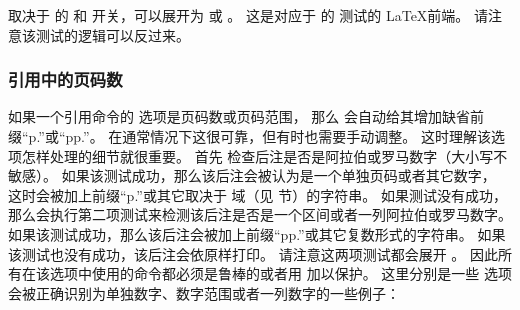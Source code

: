 \begin{ltxsyntax}



取决于  的  和  开关，可以展开为  或 。
这是对应于  的  测试的 \LaTeX 前端。
请注意该测试的逻辑可以反过来。

\end{ltxsyntax}

\subsubsection{引用中的页码数}%
\label{use:cav:pag}


如果一个引用命令的  选项是页码数或页码范围，
那么 \biblatex 会自动给其增加缺省前缀“p.”或“pp.”。
在通常情况下这很可靠，但有时也需要手动调整。
这时理解该选项怎样处理的细节就很重要。
首先 \biblatex 检查后注是否是阿拉伯或罗马数字（大小写不敏感）。
如果该测试成功，那么该后注会被认为是一个单独页码或者其它数字，
这时会被加上前缀“p.”或其它取决于  域（见  节）的字符串。
如果测试没有成功，那么会执行第二项测试来检测该后注是否是一个区间或者一列阿拉伯或罗马数字。
如果该测试成功，那么该后注会被加上前缀“pp.”或其它复数形式的字符串。
如果该测试也没有成功，该后注会依原样打印。
请注意这两项测试都会展开 。
因此所有在该选项中使用的命令都必须是鲁棒的或者用  加以保护。
这里分别是一些  选项会被正确识别为单独数字、数字范围或者一列数字的一些例子：

